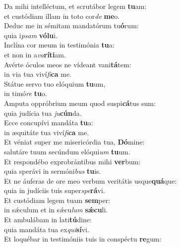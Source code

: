 \evenverse Da mihi intelléctum, et scrutábor legem \textbf{tu}am:~\*\\
\evenverse et custódiam illam in toto cor\textit{de} \textbf{me}o.\\
\oddverse Deduc me in sémitam mandatórum tu\textbf{ó}rum:~\*\\
\oddverse quia i\textit{psam} \textbf{vó}\textbf{lu}i.\\
\evenverse Inclína cor meum in testimónia \textbf{tu}a:~\*\\
\evenverse et non in a\textit{va}\textbf{rí}\textbf{ti}am.\\
\oddverse Avérte óculos meos ne vídeant vani\textbf{tá}tem:~\*\\
\oddverse in via tua viví\textit{fi}\textbf{ca} me.\\
\evenverse Státue servo tuo elóquium \textbf{tu}um,~\*\\
\evenverse in timó\textit{re} \textbf{tu}o.\\
\oddverse Amputa oppróbrium meum quod suspi\textbf{cá}tus sum:~\*\\
\oddverse quia judícia tua \textit{ju}\textbf{cún}da.\\
\evenverse Ecce concupívi mandáta \textbf{tu}a:~\*\\
\evenverse in æquitáte tua viví\textit{fi}\textbf{ca} me.\\
\oddverse Et véniat super me misericórdia tua, \textbf{Dó}mine:~\*\\
\oddverse salutáre tuum secúndum elóqui\textit{um} \textbf{tu}um.\\
\evenverse Et respondébo exprobrántibus mihi \textbf{ver}bum:~\*\\
\evenverse quia sperávi in sermóni\textit{bus} \textbf{tu}is.\\
\oddverse Et ne áuferas de ore meo verbum veritátis usque\textbf{quá}que:~\*\\
\oddverse quia in judíciis tuis super\textit{spe}\textbf{rá}vi.\\
\evenverse Et custódiam legem tuam \textbf{sem}per:~\*\\
\evenverse in sǽculum et in sǽcu\textit{lum} \textbf{sǽ}\textbf{cu}li.\\
\oddverse Et ambulábam in lati\textbf{tú}dine:~\*\\
\oddverse quia mandáta tua ex\textit{qui}\textbf{sí}vi.\\
\evenverse Et loquébar in testimóniis tuis in conspéctu \textbf{re}gum:~\*\\
